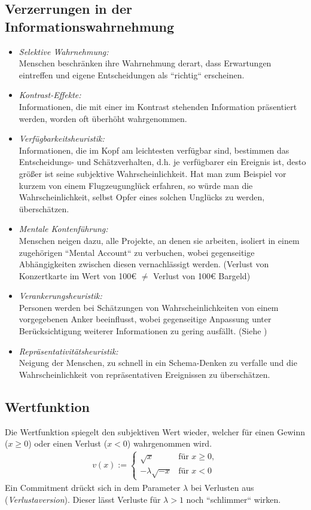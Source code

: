 \documentclass{panikzettel}
\begin{document}
\subsection{Verzerrungen in der Informationswahrnehmung \cite{vonNitzsch:211553}}
\begin{itemize}
	\item \textit{Selektive Wahrnehmung:}\\
	Menschen beschränken ihre Wahrnehmung derart, dass Erwartungen eintreffen und eigene Entscheidungen als ``richtig`` erscheinen.
	\item \textit{Kontrast-Effekte:}\\
	Informationen, die mit einer im Kontrast stehenden Information präsentiert werden, worden oft überhöht wahrgenommen.
	\item \textit{Verfügbarkeitsheuristik:}\\
	Informationen, die im Kopf am leichtesten verfügbar sind, bestimmen das Entscheidungs- und Schätzverhalten, d.h. je verfügbarer ein Ereignis ist, desto größer ist seine subjektive Wahrscheinlichkeit. Hat man zum Beispiel vor kurzem von einem Flugzeugunglück erfahren, so würde man die Wahrscheinlichkeit, selbst Opfer eines solchen Unglücks zu werden, überschätzen.
	\item \textit{Mentale Kontenführung:}\\
	Menschen neigen dazu, alle Projekte, an denen sie arbeiten, isoliert in einem zugehörigen ``Mental Account`` zu verbuchen, wobei gegenseitige Abhängigkeiten zwischen diesen vernachlässigt werden. (Verlust von Konzertkarte im Wert von 100\euro{} $ \neq $ Verlust von 100\euro{} Bargeld)
	\item \textit{Verankerungsheuristik:}\\
	Personen werden bei Schätzungen von Wahrscheinlichkeiten von einem vorgegebenen Anker beeinflusst, wobei gegenseitige Anpassung unter Berücksichtigung weiterer Informationen zu gering ausfällt. (Siehe )
	\item \textit{Repräsentativitätsheuristik:}\\
	Neigung der Menschen, zu schnell in ein Schema-Denken zu verfalle und die Wahrscheinlichkeit von repräsentativen Ereignissen zu überschätzen.
\end{itemize}

\newpage
\subsection{Wertfunktion}
Die Wertfunktion spiegelt den subjektiven Wert wieder, welcher für einen Gewinn ($ x \geq 0 $) oder einen Verlust ($ x < 0 $) wahrgenommen wird.
\begin{align*}
	v(x) := \begin{cases}
	\sqrt{x} & \text{für } x\geq 0,\\
	-\lambda\sqrt{-x} & \text{für } x < 0
	\end{cases}
\end{align*}
Ein Commitment drückt sich in dem Parameter $ \lambda $ bei Verlusten aus (\textit{Verlustaversion}). Dieser lässt Verluste für $ \lambda > 1 $ noch ``schlimmer`` wirken.
\end{document}
